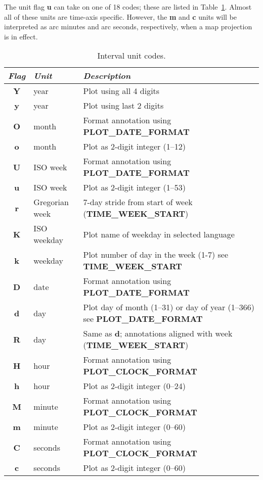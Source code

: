 The unit flag {\bf u} can take on one of 18 codes; these are listed in  Table~\ref{tbl:units}.
Almost all of these units are time-axis specific.  However, the {\bf m} and {\bf c} units will be
interpreted as arc minutes and arc seconds, respectively, when a map projection is in effect.

\begin{table}[h]
\centering
\begin{tabular}{|c|l|l|} \hline
\emph{Flag}	& \emph{Unit} & \emph{Description} \\ \hline
{\bf Y}	&	year		& Plot using all 4 digits \\ \hline
{\bf y}	&	year		& Plot using last 2 digits \\ \hline
{\bf O}	&	month		& Format annotation using {\bf PLOT\_DATE\_FORMAT} \\ \hline
{\bf o}	&	month		& Plot as 2-digit integer (1--12) \\ \hline
{\bf U}	&	ISO week	& Format annotation using {\bf PLOT\_DATE\_FORMAT} \\ \hline
{\bf u}	&	ISO week	& Plot as 2-digit integer (1--53) \\ \hline
{\bf r}	&	Gregorian week	& 7-day stride from start of week ({\bf TIME\_WEEK\_START}) \\ \hline
{\bf K}	&	ISO weekday	& Plot name of weekday in selected language \\ \hline
{\bf k}	&	weekday		& Plot number of day in the week (1-7)  {see \bf TIME\_WEEK\_START}\\ \hline
{\bf D}	&	date		& Format annotation using {\bf PLOT\_DATE\_FORMAT} \\ \hline
{\bf d}	&	day		& Plot day of month (1--31) or day of year (1--366) {see \bf PLOT\_DATE\_FORMAT} \\ \hline
{\bf R}	&	day		& Same as {\bf d}; annotations aligned with week ({\bf TIME\_WEEK\_START})\\ \hline
{\bf H}	&	hour		& Format annotation using {\bf PLOT\_CLOCK\_FORMAT} \\ \hline
{\bf h}	&	hour		& Plot as 2-digit integer (0--24) \\ \hline
{\bf M}	&	minute		& Format annotation using {\bf PLOT\_CLOCK\_FORMAT} \\ \hline
{\bf m}	&	minute		& Plot as 2-digit integer (0--60) \\ \hline
{\bf C}	&	seconds		& Format annotation using {\bf PLOT\_CLOCK\_FORMAT} \\ \hline
{\bf c}	&	seconds		& Plot as 2-digit integer (0--60) \\ \hline
\end{tabular}
\caption{Interval unit codes.}
\label{tbl:units}
\end{table}

